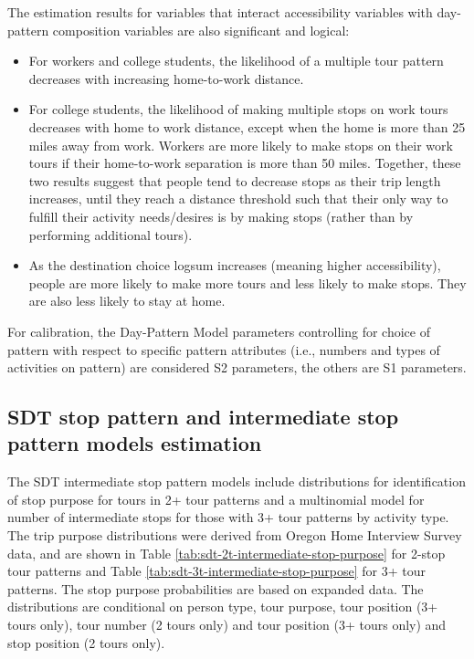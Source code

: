 The estimation results for variables that interact accessibility variables with day-pattern composition variables are also significant and logical: 
\begin{itemize}
\item For workers and college students, the likelihood of a multiple tour pattern decreases with increasing home-to-work distance.
\item For college students, the likelihood of making multiple stops on work tours decreases with home to work distance, except when the home is more than 25 miles away from work. Workers are more likely to make stops on their work tours if their home-to-work separation is more than 50 miles. Together, these two results suggest that people tend to decrease stops as their trip length increases, until they reach a distance threshold such that their only way to fulfill their activity needs/desires is by making stops (rather than by performing additional tours).
\item As the destination choice logsum increases (meaning higher accessibility), people are more likely to make more tours and less likely to make stops. They are also less likely to stay at home.
\end{itemize}

\noindent For calibration, the Day-Pattern Model parameters controlling for choice of pattern with respect to specific pattern attributes (i.e., numbers and types of activities on pattern) are considered S2 parameters, the others are S1 parameters.

\subsection{SDT stop pattern and intermediate stop pattern models estimation}
The SDT intermediate stop pattern models include distributions for identification of stop purpose for tours in 2+ tour patterns and a multinomial model for number of intermediate stops for those with 3+ tour patterns by activity type. The trip purpose distributions were derived from Oregon Home Interview Survey data, and are shown in Table \ref{tab:sdt-2t-intermediate-stop-purpose} for 2-stop tour patterns and Table \ref{tab:sdt-3t-intermediate-stop-purpose} for 3+ tour patterns. The stop purpose probabilities are based on expanded data. The distributions are conditional on person type, tour purpose, tour position (3+ tours only), tour number (2 tours only) and tour position (3+ tours only) and stop position (2 tours only). 

